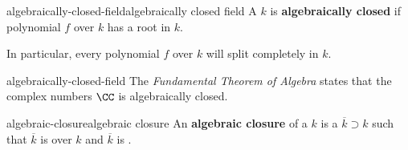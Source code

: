 \begin{topic}{algebraically-closed-field}{algebraically closed field}
    A  $k$ is \textbf{algebraically closed} if polynomial $f$ over $k$ has a root in $k$.
    
    In particular, every polynomial $f$ over $k$ will split completely in $k$.
\end{topic}

\begin{example}{algebraically-closed-field}
    The \textit{Fundamental Theorem of Algebra} states that the complex numbers $\CC$ is algebraically closed.
\end{example}

\begin{topic}{algebraic-closure}{algebraic closure}
    An \textbf{algebraic closure} of a  $k$ is a  $\overline{k} \supset k$ such that $\overline{k}$ is  over $k$ and $\overline{k}$ is .
\end{topic}
